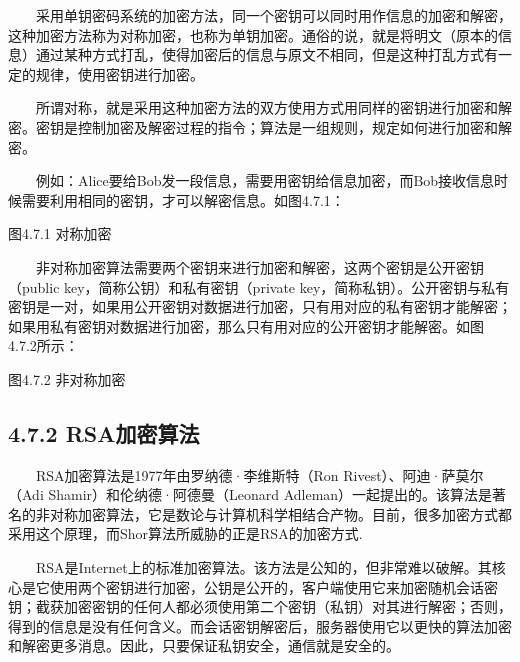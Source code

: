 \documentclass[a4paper,11pt,english]{sphinxmanual}
\begin{document}
\sphinxAtStartPar
{}

\sphinxAtStartPar
  采用单钥密码系统的加密方法，同一个密钥可以同时用作信息的加密和解密，这种加密方法称为对称加密，也称为单钥加密。通俗的说，就是将明文（原本的信息）通过某种方式打乱，使得加密后的信息与原文不相同，但是这种打乱方式有一定的规律，使用密钥进行加密。

\sphinxAtStartPar
  所谓对称，就是采用这种加密方法的双方使用方式用同样的密钥进行加密和解密。密钥是控制加密及解密过程的指令；算法是一组规则，规定如何进行加密和解密。

\sphinxAtStartPar
  例如：Alice要给Bob发一段信息，需要用密钥给信息加密，而Bob接收信息时候需要利用相同的密钥，才可以解密信息。如图4.7.1：


\begin{center}图4.7.1 对称加密
\end{center}
\sphinxAtStartPar
{}

\sphinxAtStartPar
  非对称加密算法需要两个密钥来进行加密和解密，这两个密钥是公开密钥（public key，简称公钥）和私有密钥（private key，简称私钥）。公开密钥与私有密钥是一对，如果用公开密钥对数据进行加密，只有用对应的私有密钥才能解密；如果用私有密钥对数据进行加密，那么只有用对应的公开密钥才能解密。如图4.7.2所示：


\begin{center}图4.7.2 非对称加密
\end{center}

\subsection{4.7.2 RSA加密算法}
\label{\detokenize{rst/4.7Shor_u5206_u89e3_u7b97_u6cd5:rsa}}
\sphinxAtStartPar
  RSA加密算法是1977年由罗纳德·李维斯特（Ron Rivest）、阿迪·萨莫尔（Adi Shamir）和伦纳德·阿德曼（Leonard Adleman）一起提出的。该算法是著名的非对称加密算法，它是数论与计算机科学相结合产物。目前，很多加密方式都采用这个原理，而Shor算法所威胁的正是RSA的加密方式.

\sphinxAtStartPar
  RSA是Internet上的标准加密算法。该方法是公知的，但非常难以破解。其核心是它使用两个密钥进行加密，公钥是公开的，客户端使用它来加密随机会话密钥；截获加密密钥的任何人都必须使用第二个密钥（私钥）对其进行解密；否则，得到的信息是没有任何含义。而会话密钥解密后，服务器使用它以更快的算法加密和解密更多消息。因此，只要保证私钥安全，通信就是安全的。
\end{document}
